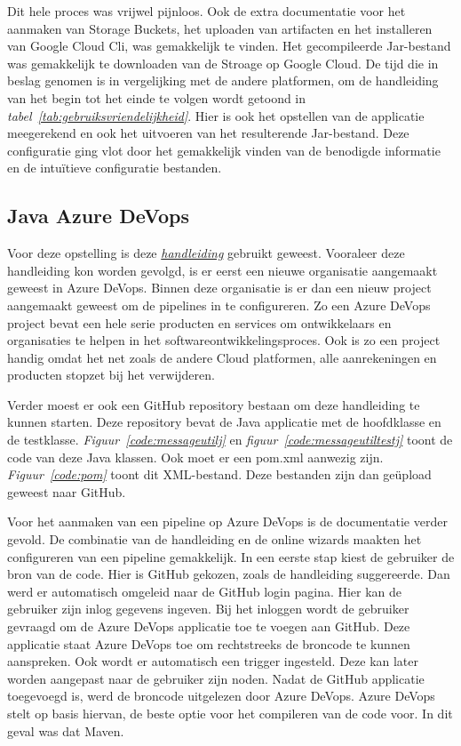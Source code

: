 Dit hele proces was vrijwel pijnloos. Ook de extra documentatie voor het aanmaken van Storage Buckets, het uploaden van artifacten en het installeren van Google Cloud Cli, was gemakkelijk te vinden. Het gecompileerde Jar-bestand was gemakkelijk te downloaden van de Stroage op Google Cloud. De tijd die in beslag genomen is in vergelijking met de andere platformen, om de handleiding van het begin tot het einde te volgen wordt getoond in \emph{tabel~\ref{tab:gebruiksvriendelijkheid}}. Hier is ook het opstellen van de applicatie meegerekend en ook het uitvoeren van het resulterende Jar-bestand. Deze configuratie ging vlot door het gemakkelijk vinden van de benodigde informatie en de intuïtieve configuratie bestanden.

\subsection{Java Azure DeVops}
\label{sec:JAD}
Voor deze opstelling is deze \emph{\href{https://docs.microsoft.com/en-us/azure/devops/pipelines/ecosystems/java?view=azure-devops}{handleiding}} gebruikt geweest. Vooraleer deze handleiding kon worden gevolgd, is er eerst een nieuwe organisatie aangemaakt geweest in Azure DeVops. Binnen deze organisatie is er dan een nieuw project aangemaakt geweest om de pipelines in te configureren. Zo een Azure DeVops project bevat een hele serie producten en services om ontwikkelaars en organisaties te helpen in het softwareontwikkelingsproces. Ook is zo een project handig omdat het net zoals de andere Cloud platformen, alle aanrekeningen en producten stopzet bij het verwijderen.

Verder moest er ook een GitHub repository bestaan om deze handleiding te kunnen starten. Deze repository bevat de Java applicatie met de hoofdklasse en de testklasse. \emph{Figuur~\ref{code:messageutilj}} en \emph{figuur~\ref{code:messageutiltestj}} toont de code van deze Java klassen. Ook moet er een pom.xml aanwezig zijn. \emph{Figuur~\ref{code:pom}} toont dit XML-bestand. Deze bestanden zijn dan geüpload geweest naar GitHub. 

Voor het aanmaken van een pipeline op Azure DeVops is de documentatie verder gevold. De combinatie van de handleiding en de online wizards maakten het configureren van een pipeline gemakkelijk. In een eerste stap kiest de gebruiker de bron van de code. Hier is GitHub gekozen, zoals de handleiding suggereerde. Dan werd er automatisch omgeleid naar de GitHub login pagina. Hier kan de gebruiker zijn inlog gegevens ingeven. Bij het inloggen wordt de gebruiker gevraagd om de Azure DeVops applicatie toe te voegen aan GitHub. Deze applicatie staat Azure DeVops toe om rechtstreeks de broncode te kunnen aanspreken. Ook wordt er automatisch een trigger ingesteld. Deze kan later worden aangepast naar de gebruiker zijn noden. Nadat de GitHub applicatie toegevoegd is, werd de broncode uitgelezen door Azure DeVops. Azure DeVops stelt op basis hiervan, de beste optie voor het compileren van de code voor. In dit geval was dat Maven.

